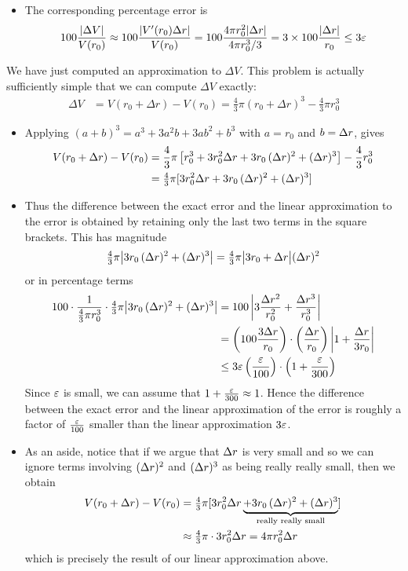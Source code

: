 \begin{eg}
\begin{itemize}
\item The corresponding percentage error is
\begin{align*}
100\frac{|\Delta V|}{V(r_0)}
\approx 100\frac{|V'(r_0)\Delta r|}{V(r_0)}
= 100\frac{4\pi r_0^2|\Delta r|}{4\pi r_0^3/3}
= 3\times 100\frac{|\Delta r|}{r_0}
\le 3\varepsilon
\end{align*}
\end{itemize}
We have just computed an approximation to $\Delta V$. This problem is actually
sufficiently simple that we can compute $\Delta V$ exactly:
\begin{align*}
  \Delta V &=  V(r_0 + \Delta r) - V(r_0)
	    = \tfrac{4}{3} \pi (r_0 + \Delta r)^3
	      - \tfrac{4}{3} \pi r_0^3
\end{align*}
\begin{itemize}
 \item Applying $(a+b)^3=a^3+3a^2b+3ab^2+b^3$ with $a=r_0$ and $b=\Delta r$, gives
\begin{align*}
V(r_0+\Delta r)-V(r_0)&=\dfrac{4}{3}\pi
\left[r_0^3+3r_0^2\Delta r+3r_0\,(\Delta r)^2+(\Delta r)^3\right] - \dfrac{4}{3}r_0^3\\
&=\tfrac{4}{3}\pi[3r_0^2\Delta r+3r_0\,(\Delta r)^2+(\Delta r)^3]
\end{align*}

\item Thus the difference between the exact error and the linear approximation
to the error is obtained by retaining only the last two terms in the square brackets. This
has magnitude
\begin{align*}
\tfrac{4}{3}\pi\big|3r_0\,(\Delta r)^2+(\Delta r)^3\big|
=\tfrac{4}{3}\pi\big|3r_0+\Delta r\big|(\Delta r)^2
\end{align*}
or in percentage terms
\begin{align*}
100\cdot \dfrac{1}{\tfrac{4}{3}\pi r_0^3} \cdot
\tfrac{4}{3}\pi \big|3r_0\,(\De r)^2+(\De r)^3\big|
%
&=100\left|3\frac{\De r^2}{r_0^2}+\frac{\De r^3}{r_0^3}\right|\\
%
&=\left(100 \frac{3\De r}{r_0}\right)
\cdot \left(\frac{\De r}{r_0}\right)
\left|1 +\frac{\De r}{3r_0}\right|\\
%
& \le 3\veps \left(\frac{\veps}{100}\right)\cdot \left(1+\frac{\veps}{300}\right)
\end{align*}
Since $\varepsilon$ is small, we can assume that $1 + \frac{\varepsilon}{300} \approx 1$. Hence the
difference between the exact error and the linear approximation of the error is roughly a
factor of $\tfrac{\varepsilon}{100}$ smaller than the linear approximation $3\varepsilon$.


\item As an aside, notice that if we argue that $\Delta r$ is very small and so we
can ignore terms involving $(\Delta r)^2$ and $(\Delta r)^3$ as being really really
small, then we obtain
\begin{align*}
V(r_0+\Delta r)-V(r_0)
&=\tfrac{4}{3}\pi[3r_0^2\Delta r \underbrace{+3r_0\,(\Delta r)^2+(\Delta
r)^3}_\text{really
really small}]\\
&\approx \tfrac{4}{3}\pi \cdot 3r_0^2\Delta r  = 4 \pi r_0^2 \Delta r
\end{align*}
which is precisely the result of our linear approximation above.


\end{itemize}
\end{eg}
